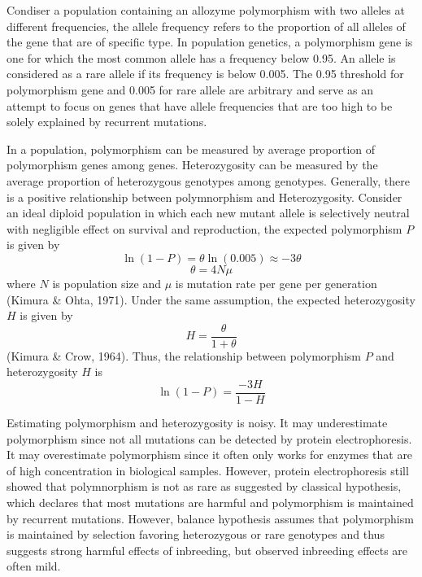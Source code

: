 \documentclass[11pt]{article}
\begin{document}
\begin{sloppypar}
\par

Condiser a population containing an allozyme polymorphism with two alleles at different frequencies, the allele frequency refers to the proportion of all alleles of the gene that are of specific type. 
In population genetics, a polymorphism gene is one for which the most common allele has a frequency below 0.95. 
An allele is considered as a rare allele if its frequency is below 0.005. 
The 0.95 threshold for polymorphism gene and 0.005 for rare allele are arbitrary and serve as an attempt to focus on genes that have allele frequencies that are too high to be solely explained by recurrent mutations. 

\par

In a population, polymorphism can be measured by average proportion of polymorphism genes among genes. 
Heterozygosity can be measured by the average proportion of heterozygous genotypes among genotypes. 
Generally, there is a positive relationship between polymnorphism and Heterozygosity. 
Consider an ideal diploid population in which each new mutant allele is selectively neutral with negligible effect on survival and reproduction, the expected polymorphism $P$ is given by 
\begin{equation}
  \ln(1-P)=\theta \ln(0.005) \approx -3\theta
\end{equation}
\begin{equation}
  \theta=4N\mu
\end{equation}
where $N$ is population size and $\mu$ is mutation rate per gene per generation (Kimura & Ohta, 1971). 
Under the same assumption, the expected heterozygosity $H$ is given by 
\begin{equation}
  H=\frac{\theta}{1+\theta}
\end{equation}
(Kimura & Crow, 1964). 
Thus, the relationship between polymorphism $P$ and heterozygosity $H$ is
\begin{equation}
  \ln(1-P)=\frac{-3H}{1-H}
\end{equation}

\par

Estimating polymorphism and heterozygosity is noisy. 
It may underestimate polymorphism since not all mutations can be detected by protein electrophoresis. 
It may overestimate polymorphism since it often only works for enzymes that are of high concentration in biological samples. 
However, protein electrophoresis still showed that polymnorphism is not as rare as suggested by classical hypothesis, which declares that most mutations are harmful and polymorphism is maintained by recurrent mutations. 
However, balance hypothesis assumes that polymorphism is maintained by selection favoring heterozygous or rare genotypes and thus suggests strong harmful effects of inbreeding, but observed inbreeding effects are often mild. 


\end{sloppypar}
\end{document}
